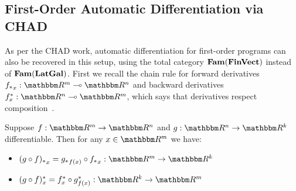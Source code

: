 \subsection{First-Order Automatic Differentiation via CHAD}
\label{sec:first-order:autodiff}

As per the CHAD work, automatic differentiation for first-order programs can also be recovered in this setup,
using the total category $\mathbf{Fam}(\mathbf{FinVect})$ instead of $\mathbf{Fam}(\mathbf{LatGal})$. First we recall the chain rule for
forward derivatives $\pushf{f}_x: \RR^m \linearto \RR^n$ and backward derivatives $\pullf{f}_x: \RR^n
\linearto \RR^m$, which says that derivatives respect composition~\cite{spivak65}.

%
%

\begin{proposition}
Suppose $f: \RR^m \to \RR^n$ and $g: \RR^n \to \RR^k$ differentiable. Then for any $x \in \RR^m$ we have:

\begin{itemize}
\item $\pushf{(g \comp f)}_x = \pushf{g}_{f(x)} \comp \pushf{f}_x: \RR^m \to \RR^k$
\item $\pullf{(g \comp f)}_x = \pullf{f}_{x} \comp \pullf{g}_{f(x)}: \RR^k \to \RR^m$
\end{itemize}
\end{proposition}

